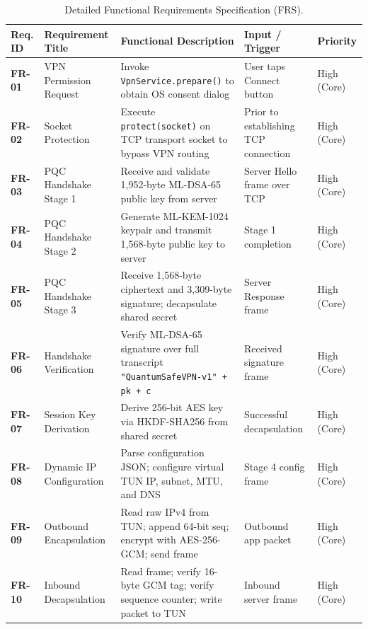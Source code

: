 \begin{table}[htbp]
  \centering
  \footnotesize
  \caption{Detailed Functional Requirements Specification (FRS).}
  \label{tab:functional_requirements_detail}
  \begin{tabular}{@{}P{1.6cm}P{3.4cm}P{4.2cm}P{2.6cm}P{1.8cm}@{}}
    \toprule
    \textbf{Req. ID} & \textbf{Requirement Title} & \textbf{Functional Description} & \textbf{Input / Trigger} & \textbf{Priority} \\
    \midrule
    \textbf{FR-01} & VPN Permission Request & Invoke \texttt{VpnService.prepare()} to obtain OS consent dialog & User taps Connect button & High (Core) \\
    \addlinespace
    \textbf{FR-02} & Socket Protection & Execute \texttt{protect(socket)} on TCP transport socket to bypass VPN routing & Prior to establishing TCP connection & High (Core) \\
    \addlinespace
    \textbf{FR-03} & PQC Handshake Stage 1 & Receive and validate 1,952-byte ML-DSA-65 public key from server & Server Hello frame over TCP & High (Core) \\
    \addlinespace
    \textbf{FR-04} & PQC Handshake Stage 2 & Generate ML-KEM-1024 keypair and transmit 1,568-byte public key to server & Stage 1 completion & High (Core) \\
    \addlinespace
    \textbf{FR-05} & PQC Handshake Stage 3 & Receive 1,568-byte ciphertext and 3,309-byte signature; decapsulate shared secret & Server Response frame & High (Core) \\
    \addlinespace
    \textbf{FR-06} & Handshake Verification & Verify ML-DSA-65 signature over full transcript \texttt{"QuantumSafeVPN-v1" + pk + c} & Received signature frame & High (Core) \\
    \addlinespace
    \textbf{FR-07} & Session Key Derivation & Derive 256-bit AES key via HKDF-SHA256 from shared secret & Successful decapsulation & High (Core) \\
    \addlinespace
    \textbf{FR-08} & Dynamic IP Configuration & Parse configuration JSON; configure virtual TUN IP, subnet, MTU, and DNS & Stage 4 config frame & High (Core) \\
    \addlinespace
    \textbf{FR-09} & Outbound Encapsulation & Read raw IPv4 from TUN; append 64-bit seq; encrypt with AES-256-GCM; send frame & Outbound app packet & High (Core) \\
    \addlinespace
    \textbf{FR-10} & Inbound Decapsulation & Read frame; verify 16-byte GCM tag; verify sequence counter; write packet to TUN & Inbound server frame & High (Core) \\

\end{tabular}
\end{table}
